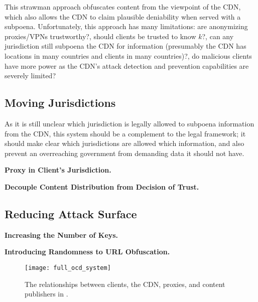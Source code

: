 This strawman approach obfuscates content from the viewpoint of the CDN, which also allows the CDN 
to claim plausible deniability when served with a subpoena.  Unfortunately, this approach has many 
limitations: are anonymizing proxies/VPNs trustworthy?, should clients be trusted to know $k$?, 
can any jurisdiction still subpoena the CDN for information (presumably the CDN has locations in many 
countries and clients in many countries)?, do malicious clients have more power as the CDN's attack 
detection and prevention capabilities are severely limited?

\subsection{Moving Jurisdictions}
As it is still unclear which jurisdiction is legally allowed to subpoena information from the CDN, this 
system should be a complement to the legal framework; it should make clear which jurisdictions are allowed 
which information, and also prevent an overreaching government from demanding data it should not have.  

{\bf Proxy in Client's Jurisdiction.}

{\bf Decouple Content Distribution from Decision of Trust.}

\subsection{Reducing Attack Surface}

{\bf Increasing the Number of Keys.}

{\bf Introducing Randomness to URL Obfuscation.}

\begin{figure}[h]
\centering
\texttt{[image: full\_ocd\_system]}
\caption{The relationships between clients, the CDN, proxies, and content publishers in 
\system{}.}
\label{fig:ocd_overview}
\end{figure}
